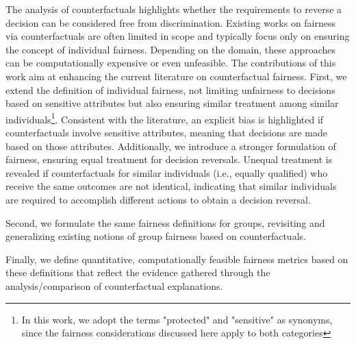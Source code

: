 \documentclass[letterpaper]{article} %
\begin{document}
The analysis of counterfactuals highlights whether the requirements to reverse a decision can be considered free from discrimination. Existing works on fairness via counterfactuals are often limited in scope and typically focus only on ensuring the concept of individual fairness. \cite{NIPS2017_a486cd07,wachter2017counterfactual}
%
Depending on the domain, these approaches can be computationally expensive or even unfeasible.
%
%
The contributions of this work aim at enhancing the current literature on counterfactual fairness.
%
First, we extend the definition of individual fairness, not limiting unfairness to decisions based on sensitive attributes but also ensuring similar treatment among similar individuals\footnote{In this work, we adopt the terms "protected" and "sensitive" as synonyms, since the fairness considerations discussed here apply to both categories}.
%
Consistent with the literature, an explicit bias is highlighted if counterfactuals involve sensitive attributes, meaning that decisions are made based on those attributes. Additionally, we introduce a stronger formulation of fairness, ensuring equal treatment for decision reversals. Unequal treatment is revealed if counterfactuals for similar individuals (i.e., equally qualified) who receive the same outcomes are not identical, indicating that similar individuals are required to accomplish different actions to obtain a decision reversal.

Second, we formulate the same fairness definitions for groups, revisiting and generalizing existing notions of group fairness based on counterfactuals.

Finally, we define quantitative, computationally feasible fairness metrics based on these definitions that reflect the evidence gathered through the analysis/comparison of counterfactual explanations.
\end{document}
